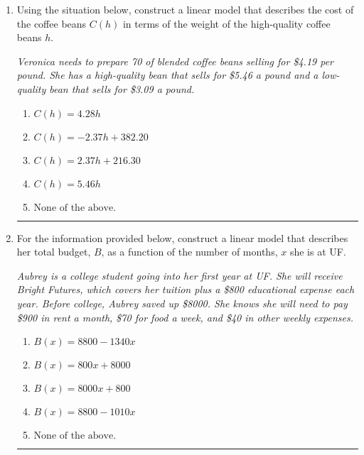 \documentclass[14pt]{extbook}
\newcommand{\litem}[1]{\item#1\hspace*{-1cm}\rule{\textwidth}{0.4pt}}
\begin{document}
\begin{enumerate}
{\begin{enumerate}[label=\Alph*.]
\end{enumerate} }
\litem{
Using the situation below, construct a linear model that describes the cost of the coffee beans $C(h)$ in terms of the weight of the high-quality coffee beans $h$.
\begin{center}
    \textit{ Veronica needs to prepare 70 of blended coffee beans selling for \$4.19 per pound. She has a high-quality bean that sells for \$5.46 a pound and a low-quality bean that sells for \$3.09 a pound. }
\end{center}
\begin{enumerate}[label=\Alph*.]
\item \( C(h) = 4.28 h \)
\item \( C(h) = -2.37 h + 382.20 \)
\item \( C(h) = 2.37 h + 216.30 \)
\item \( C(h) = 5.46 h \)
\item \( \text{None of the above.} \)

\end{enumerate} }
\litem{
For the information provided below, construct a linear model that describes her total budget, $B$, as a function of the number of months, $x$ she is at UF.
\begin{center}
    \textit{ Aubrey is a college student going into her first year at UF. She will receive Bright Futures, which covers her tuition plus a \$800 educational expense each year. Before college, Aubrey saved up \$8000. She knows she will need to pay \$900 in rent a month, \$70 for food a week, and \$40 in other weekly expenses. }
\end{center}
\begin{enumerate}[label=\Alph*.]
\item \( B(x) = 8800 - 1340 x \)
\item \( B(x) = 800 x + 8000 \)
\item \( B(x) = 8000 x + 800 \)
\item \( B(x) = 8800 - 1010 x \)
\item \( \text{None of the above.} \)

\end{enumerate} }
\end{enumerate}
\end{document}
